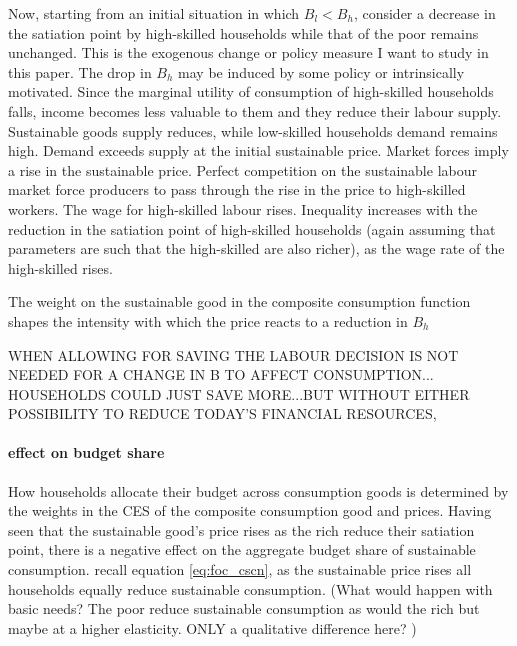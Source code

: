 Now, starting from an initial situation in which $B_l<B_h$, consider a decrease in the satiation point by high-skilled households while that of the poor remains unchanged. This is the exogenous change or policy measure I want to study in this paper. The drop in $B_h$ may be induced by some policy or intrinsically motivated. 
Since the marginal utility of consumption of high-skilled households falls, income becomes less valuable to them and they reduce their labour supply. Sustainable goods supply reduces, while low-skilled households demand remains high. Demand exceeds supply at the initial sustainable price. Market forces imply a rise in the sustainable price. Perfect competition on the sustainable labour market force producers to pass through the rise in the price to high-skilled workers. The wage for high-skilled labour rises. 
Inequality increases with the reduction in the satiation point of high-skilled households (again assuming that parameters are such that the high-skilled are also richer), as the wage rate of the high-skilled rises.


The weight on the sustainable good in the composite consumption function shapes the intensity with which the price reacts to a reduction in $B_h$

WHEN ALLOWING FOR SAVING THE LABOUR DECISION IS NOT NEEDED FOR A CHANGE IN B TO AFFECT CONSUMPTION... HOUSEHOLDS COULD JUST SAVE MORE...BUT WITHOUT EITHER POSSIBILITY TO REDUCE TODAY'S FINANCIAL RESOURCES, 

\paragraph{effect on budget share}

How households allocate their budget across consumption goods is determined by the weights in the CES of the composite consumption good and prices. Having seen that the sustainable good's price rises as the rich reduce their satiation point, there is a negative effect on the aggregate budget share of sustainable consumption. 
recall equation \ref{eq:foc_cscn}, as the sustainable price rises all households equally reduce sustainable consumption. 
(What would happen with basic needs? The poor reduce sustainable consumption as would the rich but maybe at a higher elasticity. ONLY a qualitative difference here?
)

